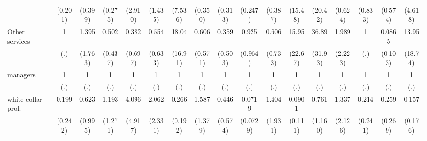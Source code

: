 {\begin{tabular}{l*{16}{c}}
                    &     (0.201)         &     (0.399)         &     (0.275)         &     (2.910)         &     (1.435)         &     (7.536)         &     (0.350)         &     (0.313)         &     (0.247)         &     (0.387)         &     (15.48)         &     (20.42)         &     (0.624)         &     (0.833)         &     (0.574)         &     (4.618)         \\
[1em]
Other services      &           1         &       1.395         &       0.502         &       0.382         &       0.554         &       18.04\sym{**} &       0.606         &       0.359         &       0.925         &       0.606         &       15.95         &       36.89\sym{***}&       1.989         &           1         &      0.0865\sym{*}  &       13.95\sym{*}  \\
                    &         (.)         &     (1.763)         &     (0.437)         &     (0.697)         &     (0.633)         &     (16.91)         &     (0.571)         &     (0.503)         &     (0.964)         &     (0.733)         &     (22.67)         &     (31.93)         &     (2.223)         &         (.)         &     (0.103)         &     (18.74)         \\
[1em]
managers            &           1         &           1         &           1         &           1         &           1         &           1         &           1         &           1         &           1         &           1         &           1         &           1         &           1         &           1         &           1         &           1         \\
                    &         (.)         &         (.)         &         (.)         &         (.)         &         (.)         &         (.)         &         (.)         &         (.)         &         (.)         &         (.)         &         (.)         &         (.)         &         (.)         &         (.)         &         (.)         &         (.)         \\
[1em]
white collar - prof.&       0.199         &       0.623         &       1.193         &       4.096         &       2.062         &       0.266         &       1.587         &       0.446         &      0.0719\sym{**} &       1.404         &      0.0901         &       0.761         &       1.337         &       0.214         &       0.259         &       0.157         \\
                    &     (0.242)         &     (0.995)         &     (1.271)         &     (4.917)         &     (2.331)         &     (0.192)         &     (1.379)         &     (0.574)         &    (0.0729)         &     (1.931)         &     (0.111)         &     (1.160)         &     (2.126)         &     (0.241)         &     (0.269)         &     (0.176)         \\

\end{tabular}}
